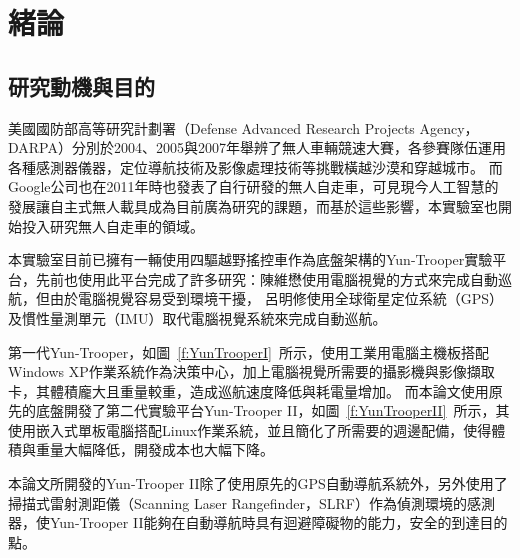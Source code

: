 \chapter{緒論}
\label{c:intro}
\section{研究動機與目的}
美國國防部高等研究計劃署（Defense Advanced Research Projects Agency，DARPA）分別於2004、2005與2007年舉辨了無人車輛競速大賽，各參賽隊伍運用各種感測器儀器，定位導航技術及影像處理技術等挑戰橫越沙漠和穿越城市。
而Google公司也在2011年時也發表了自行研發的無人自走車，可見現今人工智慧的發展讓自主式無人載具成為目前廣為研究的課題，而基於這些影響，本實驗室也開始投入研究無人自走車的領域。

本實驗室目前已擁有一輛使用四驅越野搖控車作為底盤架構的Yun-Trooper實驗平台，先前也使用此平台完成了許多研究：陳維懋\cite{chen:2011:Thesis}使用電腦視覺的方式來完成自動巡航，但由於電腦視覺容易受到環境干擾，
呂明修\cite{Liu:2012:Thesis}使用全球衛星定位系統（GPS）及慣性量測單元（IMU）取代電腦視覺系統來完成自動巡航。

第一代Yun-Trooper，如圖~\ref{f:YunTrooperI}~所示，使用工業用電腦主機板搭配Windows XP作業系統作為決策中心，加上電腦視覺所需要的攝影機與影像擷取卡，其體積龐大且重量較重，造成巡航速度降低與耗電量增加。
而本論文使用原先的底盤開發了第二代實驗平台Yun-Trooper II，如圖~\ref{f:YunTrooperII}~所示，其使用嵌入式單板電腦搭配Linux作業系統，並且簡化了所需要的週邊配備，使得體積與重量大幅降低，開發成本也大幅下降。

本論文所開發的Yun-Trooper II除了使用原先的GPS自動導航系統外，另外使用了掃描式雷射測距儀（Scanning Laser Rangefinder，SLRF）作為偵測環境的感測器，使Yun-Trooper II能夠在自動導航時具有迴避障礙物的能力，安全的到達目的點。

